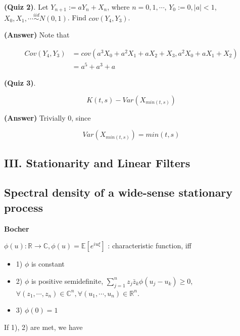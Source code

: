 \documentclass[12pt]{article}
\theoremstyle{nonumberbreak}
\begin{document}
\textbf{(Quiz 2)}. Let $Y_{n+1} := a Y_n + X_n$, where $n=0,1,\cdots$, $Y_0 := 0, |a| < 1$, $X_0, X_1, \cdots \overset{iid}{\sim} N(0,1)$. Find $cov(Y_4, Y_3)$. 


\textbf{(Answer)} Note that 

$$
\begin{aligned}
Cov(Y_4, Y_3) &= cov(a^3 X_0 + a^2 X_1 + a X_2 + X_3, a^2 X_0 + a X_1 + X_2) \\[8pt]
&= a^5 + a^3 + a
\end{aligned}
$$




\textbf{(Quiz 3)}. 


$$
K(t,s) - Var(X_{min(t,s)})
$$


\textbf{(Answer)} Trivially $0$, since

$$
Var(X_{min(t,s)}) = min(t,s)
$$




\pagebreak
\begin{center}
\section*{III. Stationarity and Linear Filters}
\end{center}
\setcounter{section}{3}
\setcounter{subsection}{0}


\subsection{Spectral density of a wide-sense stationary process}


\textbf{Bocher}

$\phi(u): \mathbb{R} \to \mathbb{C}, \phi(u) = \mathbb{E} [e^{iu\xi}]$ : characteristic function, iff

\begin{itemize}
	\item 1) $\phi$ is constant
	\item 2) $\phi$ is positive semidefinite, $\sum_{j=1}^n z_j \bar{z}_k \phi(u_j - u_k) \ge 0$, $\forall (z_1, \cdots, z_n) \in \mathbb{C}^n, \forall (u_1, \cdots, u_n) \in \mathbb{R}^n$.
	\item 3) $\phi(0) = 1$
\end{itemize}

If 1), 2) are met, we have 
\end{document}
